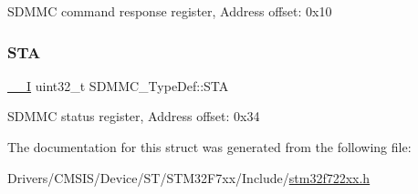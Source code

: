 S\+D\+M\+MC command response register, Address offset\+: 0x10 \mbox{\label{struct_s_d_m_m_c___type_def_a9bbd3a78b1a7fb30c53e1d17a31b9b32}} 
\subsubsection{\texorpdfstring{STA}{STA}}
{\footnotesize\ttfamily \mbox{\hyperlink{core__sc300_8h_af63697ed9952cc71e1225efe205f6cd3}{\+\_\+\+\_\+I}} uint32\+\_\+t S\+D\+M\+M\+C\+\_\+\+Type\+Def\+::\+S\+TA}

S\+D\+M\+MC status register, Address offset\+: 0x34 

The documentation for this struct was generated from the following file\+:\begin{DoxyCompactItemize}
\item 
Drivers/\+C\+M\+S\+I\+S/\+Device/\+S\+T/\+S\+T\+M32\+F7xx/\+Include/\mbox{\hyperlink{stm32f722xx_8h}{stm32f722xx.\+h}}\end{DoxyCompactItemize}
